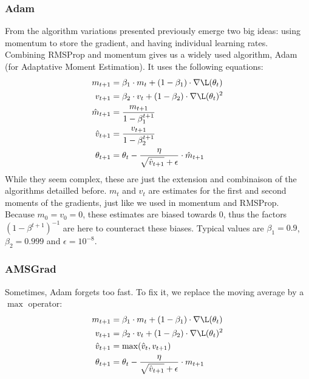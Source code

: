 \subsubsection{Adam}
From the algorithm variations presented previously emerge two big ideas: using momentum to store the gradient, and having individual learning rates. Combining RMSProp and momentum gives us a widely used algorithm, Adam (for Adaptative Moment Estimation). It uses the following equations:
\begin{equation*}
    \begin{aligned}
        m_{t+1} &= \beta_1\cdot m_t + (1-\beta_1)\cdot\nabla\L(\theta_t)\\
        v_{t+1} &= \beta_2\cdot v_t + (1-\beta_2)\cdot\nabla\L(\theta_t)^2\\
        \hat{m}_{t+1} &= \frac{m_{t+1}}{1-\beta_1^{t+1}}\\
        \hat{v}_{t+1} &= \frac{v_{t+1}}{1-\beta_2^{t+1}}\\
        \theta_{t+1} &= \theta_t - \frac{\eta}{\sqrt{\hat{v}_{t+1}}+\epsilon}\cdot\hat{m}_{t+1}
    \end{aligned}
\end{equation*}
While they seem complex, these are just the extension and combinaison of the algorithms detailled before. $m_t$ and $v_t$ are estimates for the first and second moments of the gradients, just like we used in momentum and RMSProp. Because $m_0=v_0=0$, these estimates are biased towards $0$, thus the factors $(1-\beta^{t+1})^{-1}$ are here to counteract these biases. Typical values are $\beta_1=0.9$, $\beta_2=0.999$ and $\epsilon=10^{-8}$.

\subsubsection{AMSGrad}
Sometimes, Adam forgets too fast. To fix it, we replace the moving average by a $\max$ operator:
\begin{equation*}
    \begin{aligned}
        m_{t+1} &= \beta_1\cdot m_t + (1-\beta_1)\cdot\nabla\L(\theta_t)\\
        v_{t+1} &= \beta_2\cdot v_t + (1-\beta_2)\cdot\nabla\L(\theta_t)^2\\
        \hat{v}_{t+1} &= \max(\hat{v}_t, v_{t+1})\\
        \theta_{t+1} &= \theta_t - \frac{\eta}{\sqrt{\hat{v}_{t+1}}+\epsilon}\cdot m_{t+1}
    \end{aligned}
\end{equation*}


